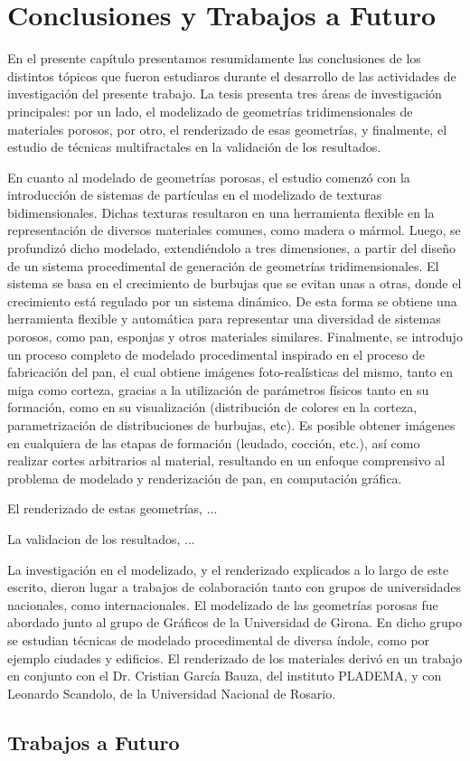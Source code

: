\chapter{Conclusiones y Trabajos a Futuro}
En el presente capítulo presentamos resumidamente las conclusiones de los distintos tópicos que fueron estudiaros durante el desarrollo de las actividades de investigación del presente trabajo.
La tesis presenta tres áreas de investigación principales: por un lado, el modelizado de geometrías tridimensionales de materiales porosos, por otro, el renderizado de esas geometrías, y finalmente, el estudio de técnicas multifractales en la validación de los resultados.

En cuanto al modelado de geometrías porosas, el estudio comenzó con la introducción de sistemas de partículas en el modelizado de texturas bidimensionales.
Dichas texturas resultaron en una herramienta flexible en la representación de diversos materiales comunes, como madera o mármol.
Luego, se profundizó dicho modelado, extendiéndolo a tres dimensiones, a partir del diseño de un sistema procedimental de generación de geometrías tridimensionales.
El sistema se basa en el crecimiento de burbujas que se evitan unas a otras, donde el crecimiento está regulado por un sistema dinámico.
De esta forma se obtiene una herramienta flexible y automática para representar una diversidad de sistemas porosos, como pan, esponjas y otros materiales similares.
Finalmente, se introdujo un proceso completo de modelado procedimental inspirado en el proceso de fabricación del pan, el cual obtiene imágenes foto-realísticas del mismo, tanto en miga como corteza, gracias a la utilización de parámetros físicos tanto en su formación, como en su visualización (distribución de colores en la corteza, parametrización de distribuciones de burbujas, etc).
Es posible obtener imágenes en cualquiera de las etapas de formación (leudado, cocción, etc.), así como realizar cortes arbitrarios al material, resultando en un enfoque comprensivo al problema de modelado y renderización de pan, en computación gráfica.

El renderizado de estas geometrías, ...

La validacion de los resultados, ...

La investigación en el modelizado, y el renderizado explicados a lo largo de este escrito, dieron lugar a trabajos de colaboración tanto con grupos de universidades nacionales, como internacionales.
El modelizado de las geometrías porosas fue abordado junto al grupo de Gráficos de la Universidad de Girona.
En dicho grupo se estudian técnicas de modelado procedimental de diversa índole, como por ejemplo ciudades y edificios.
El renderizado de los materiales derivó en un trabajo en conjunto con el Dr. Cristian García Bauza, del instituto PLADEMA, y con Leonardo Scandolo, de la Universidad Nacional de Rosario.



\section{Trabajos a Futuro}


